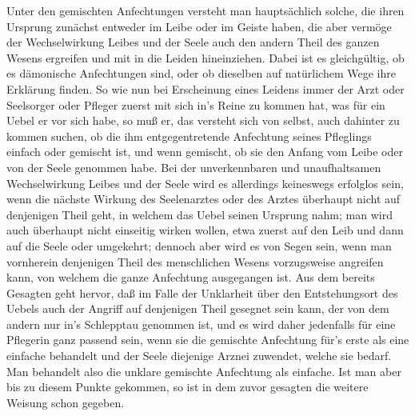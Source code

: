 Unter den gemischten Anfechtungen versteht man hauptsächlich solche, die ihren Ursprung zunächst entweder im Leibe oder im Geiste haben, die aber vermöge der Wechselwirkung Leibes und der Seele auch den andern Theil des ganzen Wesens ergreifen und mit in die Leiden hineinziehen. Dabei ist es gleichgültig, ob es dämonische Anfechtungen sind, oder ob dieselben auf natürlichem Wege ihre Erklärung finden. So wie nun bei Erscheinung eines Leidens immer der Arzt oder Seelsorger oder Pfleger zuerst mit sich in’s Reine zu kommen hat, was für ein Uebel er vor sich habe, so muß er, das versteht sich von selbst, auch dahinter zu kommen suchen, ob die ihm entgegentretende Anfechtung seines Pfleglings einfach oder gemischt ist, und wenn gemischt, ob sie den Anfang vom Leibe oder von der Seele genommen habe. Bei der unverkennbaren und unaufhaltsamen Wechselwirkung Leibes und der
Seele wird es allerdings keineswegs erfolglos sein, wenn die nächste Wirkung des Seelenarztes oder des Arztes überhaupt nicht auf denjenigen Theil geht, in welchem das Uebel seinen Ursprung nahm; man wird auch überhaupt nicht einseitig wirken wollen, etwa zuerst auf den Leib und dann auf die Seele oder umgekehrt; dennoch aber wird es von Segen sein, wenn man vornherein denjenigen Theil des menschlichen Wesens vorzugsweise angreifen kann, von welchem die ganze Anfechtung ausgegangen ist. Aus dem bereits Gesagten geht hervor, daß im Falle der Unklarheit über den Entstehungsort des Uebels auch der Angriff auf denjenigen Theil gesegnet sein kann, der von dem andern nur in’s Schlepptau genommen ist, und es wird daher jedenfalls für eine Pflegerin ganz passend sein, wenn sie die gemischte Anfechtung für’s erste als eine einfache behandelt und der Seele diejenige Arznei zuwendet, welche sie bedarf. Man behandelt also die unklare gemischte Anfechtung als einfache. Ist man aber bis zu diesem Punkte gekommen, so ist in dem zuvor gesagten die weitere Weisung schon gegeben.

